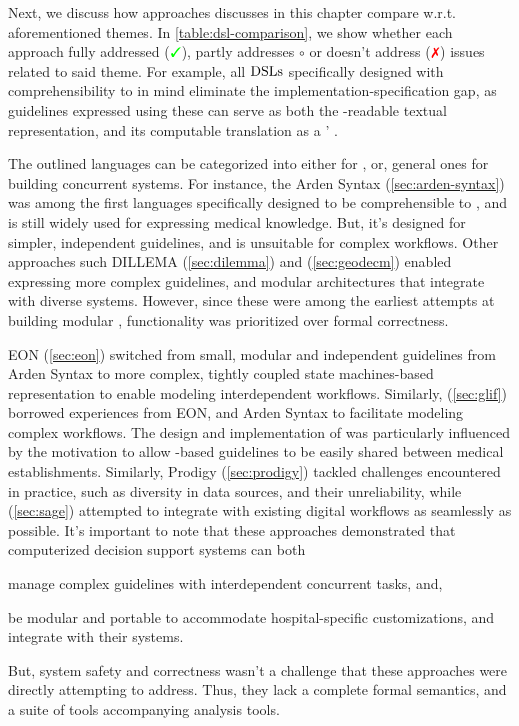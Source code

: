 Next, we discuss how approaches discusses in this chapter compare
w.r.t. aforementioned themes. In \autoref{table:dsl-comparison}, we
show whether each approach fully addressed ($\greencheck$), partly
addresses $\circ$ or doesn't address ($\redcross$) issues related
to said theme. For example, all $\text{DSLs}{}$ specifically designed
with comprehensibility to \HCPs{} in mind eliminate the
implementation-specification gap, as guidelines expressed using these \DSLs{}
can serve as both the \HCP{}-readable textual representation, and
its computable translation as a \CDSS' \BPGLogic{}.

The outlined languages can be categorized into either \DSLs{} for \CIGs{},
or, general ones for building concurrent systems. For instance,
the Arden Syntax (\autoref{sec:arden-syntax})
was among the first languages specifically designed to be
comprehensible to \HCPs{}, and is still widely used for expressing medical
knowledge. But, it's designed for simpler, independent guidelines, and
is unsuitable for complex workflows. Other approaches
such DILLEMA (\autoref{sec:dilemma}) and \GEODECM{}
(\autoref{sec:geodecm}) enabled expressing more complex guidelines,
and modular architectures that integrate with diverse systems.
However, since these were among the earliest attempts at building modular \CDSSs{},
functionality was prioritized over formal correctness.

EON (\autoref{sec:eon}) switched from small, modular and
independent guidelines from Arden Syntax to more complex,
tightly coupled state machines-based representation to enable modeling
interdependent workflows. Similarly, \GLIF{} (\autoref{sec:glif}) borrowed experiences from
EON, \GEODECM{} and Arden Syntax to facilitate modeling complex workflows.
The design and implementation of \GLIF{} was particularly influenced
by the motivation to allow \GLIF{}-based guidelines to be easily shared
between medical establishments. Similarly, Prodigy (\autoref{sec:prodigy})
tackled \CDSSs{} challenges encountered in practice, such as diversity in
 data sources, and their unreliability, while \SAGE{} (\autoref{sec:sage})
attempted to integrate with existing digital workflows as seamlessly as
possible. It's important to note that these approaches demonstrated that computerized decision support
systems can both
\begin{enumerate*}[label=(\alph*)]
  \item manage complex guidelines with interdependent concurrent tasks, and,
  \item be modular and portable to accommodate hospital-specific customizations,
    and integrate with their \EHR{} systems.
\end{enumerate*}
But, system safety and correctness wasn't a challenge that these approaches
were directly attempting to address.
Thus, they lack a complete formal semantics, and a suite of tools accompanying
analysis tools.

